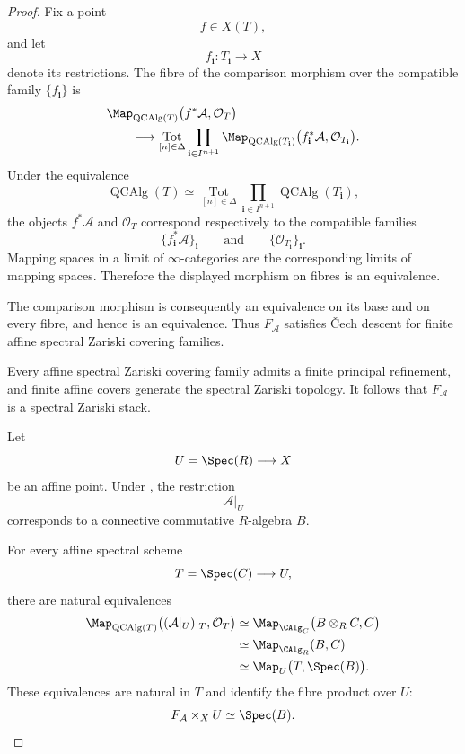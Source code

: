 \begin{proof}
Fix a point
\[
    f
    \in
    X(T),
\]
and let
\[
    f_{\mathbf i}
    \colon
    T_{\mathbf i}
    \longrightarrow
    X
\]
denote its restrictions. The fibre of the comparison morphism over the
compatible family $\{f_{\mathbf i}\}$ is
\[
\begin{aligned}
    &
    \Map_{\operatorname{QCAlg}(T)}
    \bigl(
        f^*\mathcal A,
        \mathcal O_T
    \bigr)
    \\
    &\qquad\longrightarrow
    \operatorname*{Tot}_{[n]\in\Delta}
    \prod_{\mathbf i\in I^{n+1}}
    \Map_{\operatorname{QCAlg}(T_{\mathbf i})}
    \bigl(
        f_{\mathbf i}^*\mathcal A,
        \mathcal O_{T_{\mathbf i}}
    \bigr).
\end{aligned}
\]
Under the equivalence
\[
    \operatorname{QCAlg}(T)
    \simeq
    \operatorname*{Tot}_{[n]\in\Delta}
    \prod_{\mathbf i\in I^{n+1}}
    \operatorname{QCAlg}(T_{\mathbf i}),
\]
the objects $f^*\mathcal A$ and $\mathcal O_T$ correspond respectively
to the compatible families
\[
    \{f_{\mathbf i}^*\mathcal A\}_{\mathbf i}
    \qquad\text{and}\qquad
    \{\mathcal O_{T_{\mathbf i}}\}_{\mathbf i}.
\]
Mapping spaces in a limit of $\infty$-categories are the corresponding
limits of mapping spaces. Therefore the displayed morphism on fibres is
an equivalence.

The comparison morphism is consequently an equivalence on its base and
on every fibre, and hence is an equivalence. Thus $F_{\mathcal A}$
satisfies \v{C}ech descent for finite affine spectral Zariski covering
families.

Every affine spectral Zariski covering family admits a finite principal
refinement, and finite affine covers generate the spectral Zariski
topology. It follows that $F_{\mathcal A}$ is a spectral Zariski stack.

Let
\[
    U
    =
    \Spec(R)
    \longrightarrow
    X
\]
be an affine point. Under
,
the restriction
\[
    \mathcal A|_U
\]
corresponds to a connective commutative $R$-algebra $B$.

For every affine spectral scheme
\[
    T
    =
    \Spec(C)
    \longrightarrow
    U,
\]
there are natural equivalences
\[
\begin{aligned}
    \Map_{\operatorname{QCAlg}(T)}
    \bigl(
        (\mathcal A|_U)|_T,
        \mathcal O_T
    \bigr)
    &\simeq
    \Map_{\CAlg_C}
    \bigl(
        B\otimes_R C,
        C
    \bigr)
    \\
    &\simeq
    \Map_{\CAlg_R}(B,C)
    \\
    &\simeq
    \Map_U
    \bigl(
        T,
        \Spec(B)
    \bigr).
\end{aligned}
\]
These equivalences are natural in $T$ and identify the fibre product
over $U$:
\[
    F_{\mathcal A}
    \times_X
    U
    \simeq
    \Spec(B).
\]


\end{proof}
